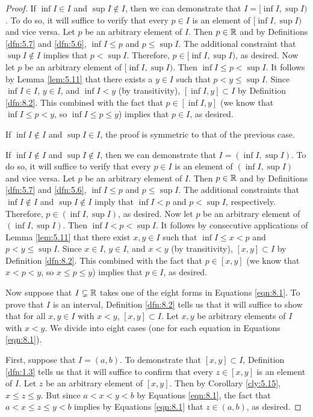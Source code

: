 \documentclass[../main.tex]{subfiles}
\begin{document}
\begin{lemma}
\begin{proof}
        If $\inf I\in I$ and $\sup I\notin I$, then we can demonstrate that $I=[\inf I,\sup I)$. To do so, it will suffice to verify that every $p\in I$ is an element of $[\inf I,\sup I)$ and vice versa. Let $p$ be an arbitrary element of $I$. Then $p\in\mathbb{R}$ and by Definitions \ref{dfn:5.7} and \ref{dfn:5.6}, $\inf I\leq p$ and $p\leq \sup I$. The additional constraint that $\sup I\notin I$ implies that $p<\sup I$. Therefore, $p\in[\inf I,\sup I)$, as desired. Now let $p$ be an arbitrary element of $[\inf I,\sup I)$. Then $\inf I\leq p<\sup I$. It follows by Lemma \ref{lem:5.11} that there exists a $y\in I$ such that $p<y\leq\sup I$. Since $\inf I\in I$, $y\in I$, and $\inf I<y$ (by transitivity), $[\inf I,y]\subset I$ by Definition \ref{dfn:8.2}. This combined with the fact that $p\in[\inf I,y]$ (we know that $\inf I\leq p<y$, so $\inf I\leq p\leq y$) implies that $p\in I$, as desired.\par
        If $\inf I\notin I$ and $\sup I\in I$, the proof is symmetric to that of the previous case.\par
        If $\inf I\notin I$ and $\sup I\notin I$, then we can demonstrate that $I=(\inf I,\sup I)$. To do so, it will suffice to verify that every $p\in I$ is an element of $(\inf I,\sup I)$ and vice versa. Let $p$ be an arbitrary element of $I$. Then $p\in\mathbb{R}$ and by Definitions \ref{dfn:5.7} and \ref{dfn:5.6}, $\inf I\leq p$ and $p\leq \sup I$. The additional constraints that $\inf I\notin I$ and $\sup I\notin I$ imply that $\inf I<p$ and $p<\sup I$, respectively. Therefore, $p\in(\inf I,\sup I)$, as desired. Now let $p$ be an arbitrary element of $(\inf I,\sup I)$. Then $\inf I<p<\sup I$. It follows by consecutive applications of Lemma \ref{lem:5.11} that there exist $x,y\in I$ such that $\inf I\leq x<p$ and $p<y\leq\sup I$. Since $x\in I$, $y\in I$, and $x<y$ (by transitivity), $[x,y]\subset I$ by Definition \ref{dfn:8.2}. This combined with the fact that $p\in[x,y]$ (we know that $x<p<y$, so $x\leq p\leq y$) implies that $p\in I$, as desired.\par\bigskip
        Now suppose that $I\subsetneq\mathbb{R}$ takes one of the eight forms in Equations \ref{eqn:8.1}. To prove that $I$ is an interval, Definition \ref{dfn:8.2} tells us that it will suffice to show that for all $x,y\in I$ with $x<y$, $[x,y]\subset I$. Let $x,y$ be arbitrary elements of $I$ with $x<y$. We divide into eight cases (one for each equation in Equations \ref{eqn:8.1}).\par\smallskip
        First, suppose that $I=(a,b)$. To demonstrate that $[x,y]\subset I$, Definition \ref{dfn:1.3} tells us that it will suffice to confirm that every $z\in[x,y]$ is an element of $I$. Let $z$ be an arbitrary element of $[x,y]$. Then by Corollary \ref{cly:5.15}, $x\leq z\leq y$. But since $a<x<y<b$ by Equations \ref{eqn:8.1}, the fact that $a<x\leq z\leq y<b$ implies by Equations \ref{eqn:8.1} that $z\in(a,b)$, as desired.\par

\end{proof}
\end{lemma}
\end{document}
